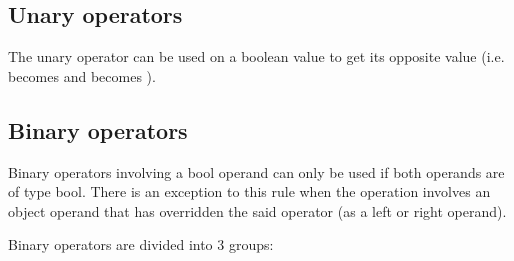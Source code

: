 \subsection{Unary operators}
\label{sec:orgb412ce4}

The unary operator \token{!} can be used on a boolean value to get its opposite
value (i.e.  becomes  and  becomes
).

\subsection{Binary operators}
\label{sec:org030ae50}

Binary operators involving a bool operand can only be used if both operands are
of type bool. There is an exception to this rule when the operation involves an
object operand that has overridden the said operator (as a left or right
operand).

Binary operators are divided into 3 groups:

